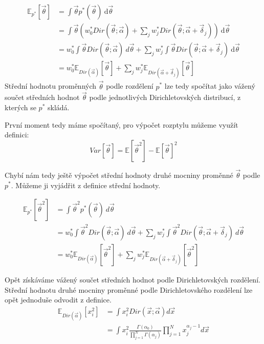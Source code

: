 \begin{align}
\mathbb{E}_{p^*}[\vec\theta] &= \int \vec\theta p^*(\vec\theta) ~ \mathrm{d}\vec\theta
\\
&= \int \vec\theta (
	w_0^* Dir(\vec{\theta}; \vec{\alpha}) +
	\sum_j w^*_j
        	Dir(\vec{\theta}; \vec{\alpha} + \vec{\delta}_j)
    ) ~ \mathrm{d}\vec\theta
\\
&= w_0^* \int \vec\theta Dir(\vec{\theta}; \vec{\alpha}) ~ d\vec\theta +
	\sum_j w_j^* \int \vec\theta Dir(\vec{\theta}; \vec{\alpha} + \vec{\delta}_j)
    ~ \mathrm{d}\vec\theta
\\
&= w_0^* \mathbb{E}_{Dir(\vec\alpha)}[\vec\theta] +
	\sum_j w_j^* \mathbb{E}_{Dir(\vec\alpha + \vec{\delta}_j)}[\vec\theta]
\end{align}
Střední hodnotu proměnných $\vec\theta$ podle rozdělení $p^*$ lze tedy spočítat
jako vážený součet středních hodnot $\vec\theta$ podle jednotlivých
Dirichletovských distribucí, z kterých se $p^*$ skládá.

První moment tedy máme spočítaný, pro výpočet rozptylu můžeme využít
definici:
\begin{equation}
	Var[\vec{\theta}] = \mathbb{E}[\vec{\theta}^2] - \mathbb{E}[\vec\theta]^2
\end{equation}

Chybí nám tedy ještě výpočet střední hodnoty druhé mocniny proměnné
$\vec\theta$ podle $p^*$. Můžeme ji vyjádřit z definice střední hodnoty.

\begin{align}
\mathbb{E}_{p^*}[\vec\theta^2] &= \int \vec\theta^2 p^*(\vec\theta) ~ d\vec\theta
\\
&= w_0^* \int \vec\theta^2 Dir(\vec{\theta}; \vec{\alpha}) ~ d\vec\theta +
	\sum_j w_j^* \int \vec\theta^2 Dir(\vec{\theta}; \vec{\alpha} + \vec{\delta}_j)
	 ~ d\vec\theta
\\
&= w_0^* \mathbb{E}_{Dir(\vec\alpha)}[\vec\theta^2] +
	\sum_j w_j^* \mathbb{E}_{Dir(\vec\alpha + \vec{\delta}_j)}[\vec\theta^2]
\end{align}

Opět získáváme vážený součet středních hodnot podle Dirichletovských rozdělení.
Střední hodnotu druhé mocniny proměnné podle Dirichletovského rozdělení
lze opět jednoduše odvodit z definice.
\begin{align}
\mathbb{E}_{Dir(\vec\alpha)}[x_i^2] &=
	\int x_i^2 Dir(\vec x; \vec\alpha) d\vec x
\\
&=
	\int x_i^2 \frac{\Gamma(\alpha_0)}
			   {\prod_{j=1}^N \Gamma(\alpha_j)}
		\prod_{j=1}^N x_j^{\alpha_j - 1} d\vec x
\end{align}

